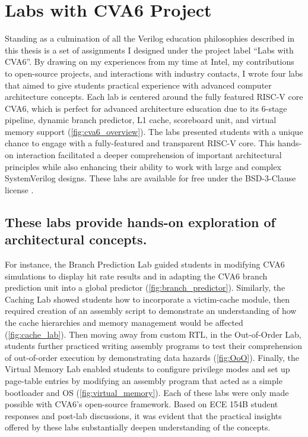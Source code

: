 
\chapter{Labs with CVA6 Project}
\label{chapter:labs_with_cva6}



Standing as a culmination of all the Verilog education philosophies described in this thesis is a set of assignments I designed under the project label ``Labs with CVA6''. By drawing on my experiences from my time at Intel, my contributions to open-source projects, and interactions with industry contacts, I wrote four labs that aimed to give students practical experience with advanced computer architecture concepts. Each lab is centered around the fully featured RISC-V core CVA6, which is perfect for advanced architecture education due to its 6-stage pipeline, dynamic branch predictor, L1 cache, scoreboard unit, and virtual memory support (\autoref{fig:cva6_overview}). The labs presented students with a unique chance to engage with a fully-featured and transparent RISC-V core. This hands-on interaction facilitated a deeper comprehension of important architectural principles while also enhancing their ability to work with large and complex SystemVerilog designs. These labs are available for free under the BSD-3-Clause license \cite{labsWithCVA6}.

\FloatBarrier

\section{These labs provide hands-on exploration of architectural concepts.}






For instance, the Branch Prediction Lab guided students in modifying CVA6 simulations to display hit rate results and in adapting the CVA6 branch prediction unit into a global predictor (\autoref{fig:branch_predictor}). Similarly, the Caching Lab showed students how to incorporate a victim-cache module, then required creation of an assembly script to demonstrate an understanding of how the cache hierarchies and memory management would be affected (\autoref{fig:cache_lab}). Then moving away from custom RTL, in the Out-of-Order Lab, students further practiced writing assembly programs to test their comprehension of out-of-order execution by demonstrating data hazards (\autoref{fig:OoO}). Finally, the Virtual Memory Lab enabled students to configure privilege modes and set up page-table entries by modifying an assembly program that acted as a simple bootloader and OS (\autoref{fig:virtual_memory}). Each of these labs were only made possible with CVA6's open-source framework. Based on ECE 154B student responses and post-lab discussions, it was evident that the practical insights offered by these labs substantially deepen understanding of the concepts.

